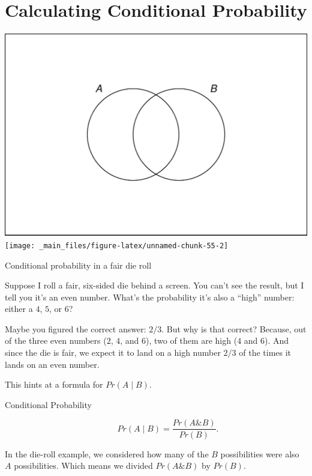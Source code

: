 \documentclass[justified]{tufte-book}
\newcommand{\given}{\mid}
\renewcommand{\wedge}{\mathbin{\&}}
\newcommand{\p}{Pr}
\theoremstyle{definition}
\theoremstyle{definition}
\theoremstyle{definition}
\theoremstyle{definition}
\theoremstyle{remark}
\begin{document}
\hypertarget{calculating-conditional-probability}{%
\section{Calculating Conditional Probability}\label{calculating-conditional-probability}}

\begin{marginfigure}
\includegraphics{_main_files/figure-latex/unnamed-chunk-55-1} \texttt{[image: \_main\_files/figure-latex/unnamed-chunk-55-2]} \caption[Conditional probability in a fair die roll]{Conditional probability in a fair die roll}\label{fig:unnamed-chunk-55}
\end{marginfigure}

Suppose I roll a fair, six-sided die behind a screen. You can't see the result, but I tell you it's an even number. What's the probability it's also a ``high'' number: either a \(4\), \(5\), or \(6\)?

Maybe you figured the correct answer: \(2/3\). But why is that correct? Because, out of the three even numbers (\(2\), \(4\), and \(6\)), two of them are high (\(4\) and \(6\)). And since the die is fair, we expect it to land on a high number \(2/3\) of the times it lands on an even number.

This hints at a formula for \(\p(A \given B)\).

\begin{description}
\item[Conditional Probability]
\[ \p(A \given B) = \frac{\p(A \wedge B)}{\p(B)}. \]
\end{description}

In the die-roll example, we considered how many of the \(B\) possibilities were also \(A\) possibilities. Which means we divided \(\p(A \wedge B)\) by \(\p(B)\).
\end{document}
